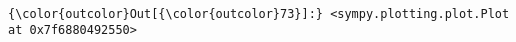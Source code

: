 \documentclass[11pt]{article}
\begin{document}
    \begin{center}
    \end{center}
    { \hspace*{\fill} \\}
    
\begin{Verbatim}[commandchars=\\\{\}]
{\color{outcolor}Out[{\color{outcolor}73}]:} <sympy.plotting.plot.Plot at 0x7f6880492550>
\end{Verbatim}
            

    
    
    
    
\end{document}
